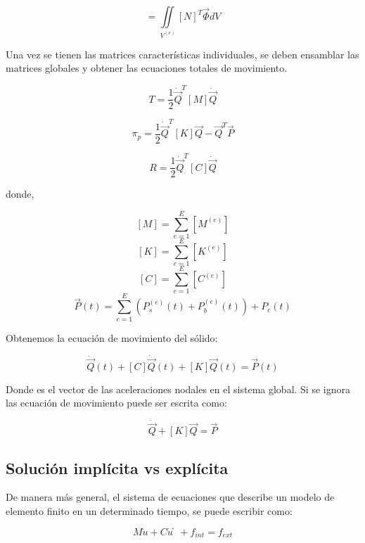 \begin{equation}
[P_b^{(e)}] = \iint\limits_{V^{(e)}} [N]^T \vec{\Phi} dV
\end{equation}

Una vez se tienen las matrices características individuales, se deben  ensamblar las matrices globales y 
obtener las ecuaciones totales de movimiento.

\begin{equation}
T = \frac{1}{2} \dot{\vec{Q}}^T [M] \dot{\vec{Q}}
\end{equation}

\begin{equation}
\pi_p = \frac{1}{2} \dot{\vec{Q}}^T [K] \vec{Q} - \vec{Q}^T \vec{P}
\end{equation}

\begin{equation}
R = \frac{1}{2} \dot{\vec{Q}}^T [C] \dot{\vec{Q}}
\end{equation}

donde, 

$$
[M] = \sum\limits_{e=1}^{E} [M^{(e)}]
$$
$$[K] = \sum\limits_{e=1}^{E} [K^{(e)}]$$
$$[C] = \sum\limits_{e=1}^{E} [C^{(e)}]$$
$$
\vec{P}(t) = \sum\limits_{e=1}^{E} 
\left(
P_s^{(e)}(t) + P_b^{(e)}(t) 
\right)
+ P_c (t)
$$

Obtenemos la ecuación de movimiento del sólido:

\begin{equation}
[M] \ddot{\vec{Q}}(t) + [C] \dot{\vec{Q}}(t) + [K] \vec{Q} (t) = \vec{P} (t)
\end{equation}

Donde  es el vector de las aceleraciones nodales en el sistema global. Si se ignora 
las ecuación de movimiento puede ser escrita como:

\begin{equation}
[M] \ddot{\vec{Q}} + [K] \vec{Q} = \vec{P}
\end{equation}


\subsection{Solución implícita vs explícita}

De manera más general, el sistema de ecuaciones que describe un modelo de elemento finito en un determinado tiempo, se puede escribir como:

\begin{equation}
M\ddot{u} + C\dot{u} ̇+ f_{int} = f_{ext}
\end{equation}

